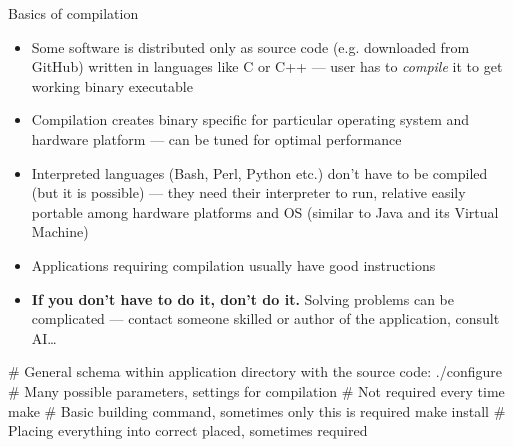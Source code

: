 \documentclass[compress, xelatex, 11pt, xcolor=svgnames, aspectratio=169, url={hyphens, lowtilde}]{beamer}
\begin{document}
\begin{frame}[fragile]{Basics of compilation}
	\begin{itemize}
		\item Some software is distributed only as source code (e.g. downloaded from GitHub) written in languages like C or C++ --- user has to \textit{compile} it to get working binary executable
		\item Compilation creates binary specific for particular operating system and hardware platform --- can be tuned for optimal performance
		\item Interpreted languages (Bash, Perl, Python etc.) don't have to be compiled (but it is possible) --- they need their interpreter to run, relative easily portable among hardware platforms and OS (similar to Java and its Virtual Machine)
		\item Applications requiring compilation usually have good instructions
		\item \textbf{If you don't have to do it, don't do it.}\textbf{} Solving problems can be complicated --- contact someone skilled or author of the application, consult AI\ldots
	\end{itemize}
	\begin{bashcode}
    # General schema within application directory with the source code:
    ./configure # Many possible parameters, settings for compilation
                # Not required every time
    make # Basic building command, sometimes only this is required
    make install # Placing everything into correct placed, sometimes required
	\end{bashcode}
\end{frame}
\end{document}
